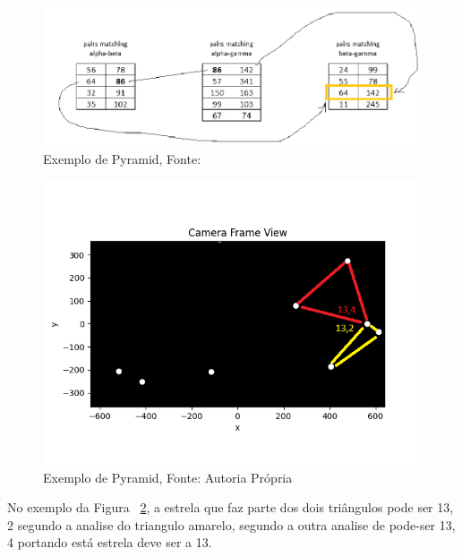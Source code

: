 \begin{figure}[H]
    \centering
    \includegraphics[width=1\textwidth]{images/Pyramid_02.png}
    \caption{Exemplo de Pyramid, Fonte: ~\cite[]{Fialho}}
    \label{fig:pyramid_02}
\end{figure}

\begin{figure}[H]
    \centering
    \includegraphics[width=1\textwidth]{images/Pyramid_03.png}
    \caption{Exemplo de Pyramid, Fonte: Autoria Própria}
    \label{fig:pyramid_03}
\end{figure}

No exemplo da Figura ~\ref{fig:pyramid_03}, a estrela que faz parte dos dois triângulos pode ser 13, 2 segundo a analise do triangulo amarelo, 
segundo a outra analise de pode-ser 13, 4 portando está estrela deve ser a 13.
